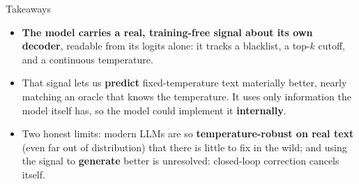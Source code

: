 \documentclass[aspectratio=169]{beamer}
\begin{document}
\begin{frame}{Takeaways}
  \begin{itemize}
    \item \textbf{The model carries a real, training-free signal about its own
      decoder}, readable from its logits alone: it tracks a blacklist, a top-$k$
      cutoff, and a continuous temperature.
    \item That signal lets us \textbf{predict} fixed-temperature text materially better,
      nearly matching an oracle that knows the temperature. It uses only information the
      model itself has, so the model could implement it \textbf{internally}.
    \item Two honest limits: modern LLMs are so \textbf{temperature-robust on real text}
      (even far out of distribution) that there is little to fix in the wild; and using
      the signal to \textbf{generate} better is unresolved: closed-loop correction
      cancels itself.
  \end{itemize}
\end{frame}
\end{document}
